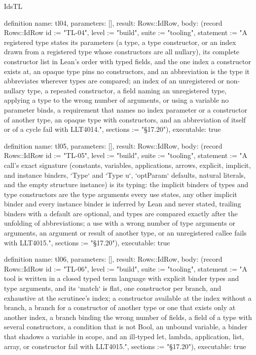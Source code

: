 \begin{lexlean}{IdsTL}
\begin{semanticmodule}
definition{
  name: tl04,
  parameters: [],
  result: Rows::IdRow,
  body: (record Rows::IdRow {id := "TL-04", level := "build", suite := "tooling", statement := "A registered type states its parameters (a type, a type constructor, or an index drawn from a registered type whose constructors are all nullary), its complete constructor list in Lean's order with typed fields, and the one index a constructor exists at, an opaque type pins no constructors, and an abbreviation is the type it abbreviates wherever types are compared; an index of an unregistered or non-nullary type, a repeated constructor, a field naming an unregistered type, applying a type to the wrong number of arguments, or using a variable no parameter binds, a requirement that names no index parameter or a constructor of another type, an opaque type with constructors, and an abbreviation of itself or of a cycle fail with LLT4014.", sections := "§17.20"}),
  executable: true
}

definition{
  name: tl05,
  parameters: [],
  result: Rows::IdRow,
  body: (record Rows::IdRow {id := "TL-05", level := "build", suite := "tooling", statement := "A call's exact signature (constants, variables, applications, arrows, explicit, implicit, and instance binders, `Type` and `Type u`, `optParam` defaults, natural literals, and the empty structure instance) is its typing: the implicit binders of types and type constructors are the type arguments every use states, any other implicit binder and every instance binder is inferred by Lean and never stated, trailing binders with a default are optional, and types are compared exactly after the unfolding of abbreviations; a use with a wrong number of type arguments or arguments, an argument or result of another type, or an unregistered callee fails with LLT4015.", sections := "§17.20"}),
  executable: true
}

definition{
  name: tl06,
  parameters: [],
  result: Rows::IdRow,
  body: (record Rows::IdRow {id := "TL-06", level := "build", suite := "tooling", statement := "A tool is written in a closed typed term language with explicit binder types and type arguments, and its `match` is flat, one constructor per branch, and exhaustive at the scrutinee's index; a constructor available at the index without a branch, a branch for a constructor of another type or one that exists only at another index, a branch binding the wrong number of fields, a field of a type with several constructors, a condition that is not Bool, an unbound variable, a binder that shadows a variable in scope, and an ill-typed let, lambda, application, list, array, or constructor fail with LLT4015.", sections := "§17.20"}),
  executable: true
}


\end{semanticmodule}
\end{lexlean}
